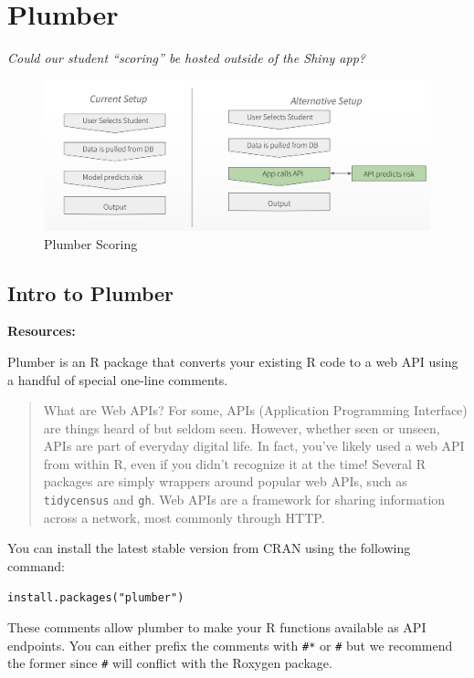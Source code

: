 \documentclass[]{book}
\theoremstyle{definition}
\theoremstyle{definition}
\theoremstyle{definition}
\theoremstyle{remark}
\begin{document}
\hypertarget{plumber}{%
\section{Plumber}\label{plumber}}

\emph{Could our student ``scoring'' be hosted outside of the Shiny app?}

\begin{figure}
\centering
\includegraphics{imgs/shiny-alt/plumber-alt.png}
\caption{Plumber Scoring}
\end{figure}

\hypertarget{intro-to-plumber}{%
\subsection{Intro to Plumber}\label{intro-to-plumber}}

\textbf{Resources:}

Plumber is an R package that converts your existing R code to a web API
using a handful of special one-line comments.

\begin{quote}
What are Web APIs? For some, APIs (Application Programming Interface)
are things heard of but seldom seen. However, whether seen or unseen,
APIs are part of everyday digital life. In fact, you've likely used a
web API from within R, even if you didn't recognize it at the time!
Several R packages are simply wrappers around popular web APIs, such as
\texttt{tidycensus} and \texttt{gh}. Web APIs are a framework for
sharing information across a network, most commonly through HTTP.
\end{quote}

You can install the latest stable version from CRAN using the following
command:

\begin{verbatim}
install.packages("plumber")
\end{verbatim}

These comments allow plumber to make your R functions available as API
endpoints. You can either prefix the comments with \texttt{\#*} or
\texttt{\#\textquotesingle{}} but we recommend the former since
\texttt{\#\textquotesingle{}} will conflict with the Roxygen package.
\end{document}

